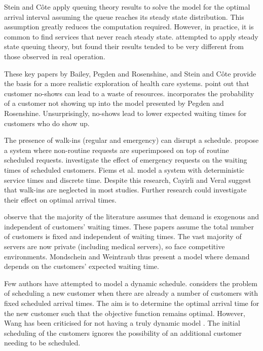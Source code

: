 Stein and C\^{o}te apply queuing theory results to solve the model for the optimal arrival interval assuming the queue reaches its steady state distribution. This assumption greatly reduces the computation required. However, in practice, it is common to find services that never reach steady state. \citet{Babes} attempted to apply steady state queuing theory, but found their results tended to be very different from those observed in real operation.

These key papers by Bailey, Pegden and Rosenshine, and Stein and C\^{o}te provide the basis for a more realistic exploration of health care systems. \citet{Delaurentis} point out that customer no-shows can lead to a waste of resources. \citet{Mendel} incorporates the probability of a customer not showing up into the model presented by Pegden and Rosenshine. Unsurprisingly, no-shows lead to lower expected waiting times for customers who do show up.

The presence of walk-ins (regular and emergency) can disrupt a schedule. \citet{Gupta} propose a system where non-routine requests are superimposed on top of routine scheduled requests. \citet{Fiems} investigate the effect of emergency requests on the waiting times of scheduled customers. Fiems et al. model a system with deterministic service times and discrete time. Despite this research, Cayirli and Veral suggest that walk-ins are neglected in most studies. Further research could investigate their effect on optimal arrival times.

\citet{Mondschein} observe that the majority of the literature assumes that demand is exogenous and independent of customers' waiting times. These papers assume the total number of customers is fixed and independent of waiting times. The vast majority of servers are now private (including medical servers), so face competitive environments. Mondschein and Weintraub thus present a model where demand depends on the customers' expected waiting time.

Few authors have attempted to model a dynamic schedule. \citet{Wang} considers the problem of scheduling a new customer when there are already a number of customers with fixed scheduled arrival times. The aim is to determine the optimal arrival time for the new customer such that the objective function remains optimal. However, Wang has been criticised for not having a truly dynamic model \citep{Erdogan}. The initial scheduling of the customers ignores the possibility of an additional customer needing to be scheduled.

